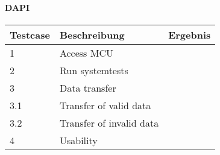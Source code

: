 \documentclass[
]{article}
\begin{document}
\hypertarget{header-n274}{%
\paragraph{\texorpdfstring{DAPI }{DAPI }}\label{header-n274}}

\begin{longtable}[]{@{}lll@{}}
\toprule
Testcase & Beschreibung & Ergebnis\tabularnewline
\midrule
\endhead
1 & Access MCU &\tabularnewline
2 & Run systemtests &\tabularnewline
3 & Data transfer &\tabularnewline
3.1 & Transfer of valid data &\tabularnewline
3.2 & Transfer of invalid data &\tabularnewline
4 & Usability &\tabularnewline
\bottomrule
\end{longtable}
\end{document}
